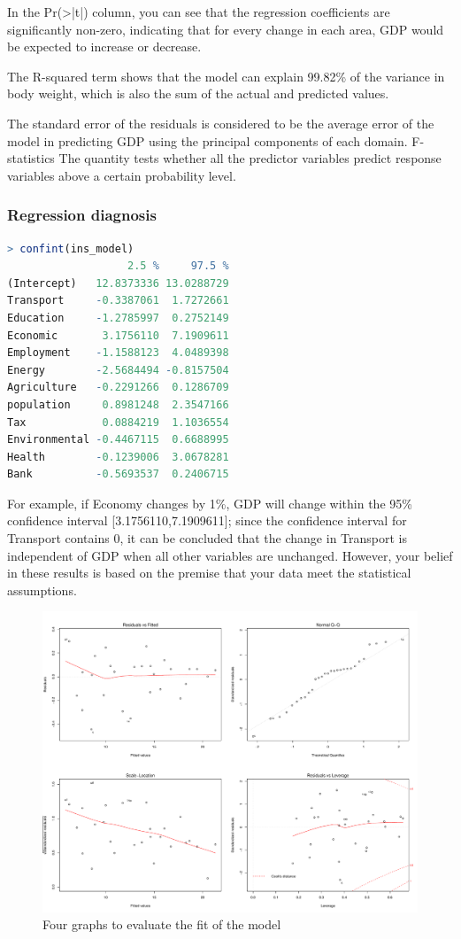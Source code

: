 \documentclass{apmcmthesis}
\begin{document}
In the Pr(>|t|) column, you can see that the regression coefficients are significantly non-zero, indicating that for every change in each area, GDP would be expected to increase or decrease.

The R-squared term shows that the model can explain 99.82\% of the variance in body weight, which is also the sum of the actual and predicted values.

The standard error of the residuals is considered to be the average error of the model in predicting GDP using the principal components of each domain. F-statistics
The quantity tests whether all the predictor variables predict response variables above a certain probability level.

\subsubsection{Regression diagnosis}
\begin{lstlisting}[language=r]
> confint(ins_model)
                   2.5 %     97.5 %
(Intercept)   12.8373336 13.0288729
Transport     -0.3387061  1.7272661
Education     -1.2785997  0.2752149
Economic       3.1756110  7.1909611
Employment    -1.1588123  4.0489398
Energy        -2.5684494 -0.8157504
Agriculture   -0.2291266  0.1286709
population     0.8981248  2.3547166
Tax            0.0884219  1.1036554
Environmental -0.4467115  0.6688995
Health        -0.1239006  3.0678281
Bank          -0.5693537  0.2406715     
\end{lstlisting}

For example, if Economy changes by 1\%, GDP will change within the 95\% confidence interval [3.1756110,7.1909611]; since the confidence interval for Transport contains 0, it can be concluded that the change in Transport is independent of GDP when all other variables are unchanged. 
However, your belief in these results is based on the premise that your data meet the statistical assumptions.

\begin{figure}[H]
	\centering
	\includegraphics[width=0.7\linewidth]{四幅图}
	\caption{Four graphs to evaluate the fit of the model}
\end{figure}
\end{document}
